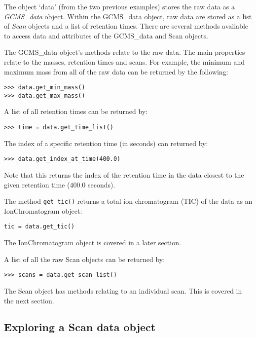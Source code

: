 The object `data' (from the two previous examples) stores the raw data as a {\em
GCMS\_data} object. Within the GCMS\_data object, raw data are stored as a list
of {\em Scan} objects and a list of retention times.  There are several methods
available to access data and attributes of the GCMS\_data and Scan objects.

The GCMS\_data object's methods relate to the raw data. The main properties
relate to the masses, retention times and scans. For example, the
minimum and maximum mass from all of the raw data can be returned by the
following:

\begin{verbatim}
>>> data.get_min_mass()
>>> data.get_max_mass()
\end{verbatim}

A list of all retention times can be returned by:

\begin{verbatim}
>>> time = data.get_time_list()
\end{verbatim}

The index of a specific retention time (in seconds) can returned by:

\begin{verbatim}
>>> data.get_index_at_time(400.0)
\end{verbatim}

\noindent
Note that this returns the index of the retention time in the
data closest to the given retention time (400.0 seconds).

The method {\tt get\_tic()} returns a total ion chromatogram (TIC) of the data
as an IonChromatogram object:

\begin{verbatim}
tic = data.get_tic()
\end{verbatim}

\noindent
The IonChromatogram object is covered in a later section.

A list of all the raw Scan objects can be returned by:

\begin{verbatim}
>>> scans = data.get_scan_list()
\end{verbatim}

\noindent
The Scan object has methods relating to an individual scan. This is covered in
the next section.

\subsection {Exploring a Scan data object}

